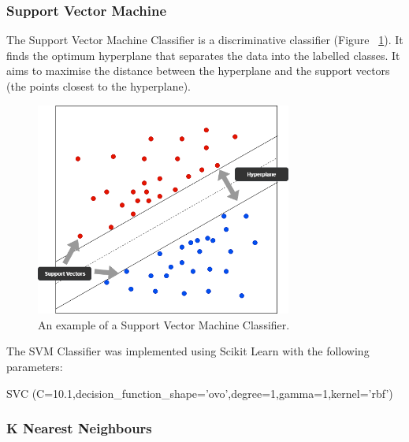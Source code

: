 \subsubsection*{Support Vector Machine}

The Support Vector Machine Classifier is a discriminative classifier (Figure ~\ref{fig:svm}). It finds the optimum hyperplane that separates the data into the labelled classes. It aims to maximise the distance between the hyperplane and the support vectors (the points closest to the hyperplane).

\begin{figure}[h!]
\centering
\includegraphics[width=0.75\textwidth]{design_and_methodology/svm.png}
\caption{\label{fig:svm} An example of a Support Vector Machine Classifier.}
\end{figure}

The SVM Classifier was implemented using Scikit Learn with the following parameters:

\begin{tcolorbox}
\begin{center}
	SVC (C=10.1,decision\_function\_shape='ovo',degree=1,gamma=1,kernel='rbf')
\end{center}
\end{tcolorbox}

\subsubsection*{K Nearest Neighbours}

